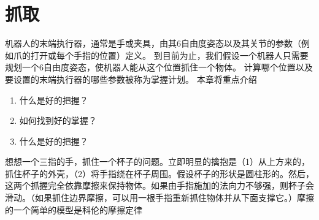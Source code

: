 \chapter{抓取}


机器人的末端执行器，通常是手或夹具，由其6自由度姿态以及其关节的参数（例如爪的打开或每个手指的位置）定义。 到目前为止，我们假设一个机器人只需要规划一个6自由度姿态，使机器人能从这个位置抓住一个物体。 计算哪个位置以及要设置的末端执行器的哪些参数被称为掌握计划。 本章将重点介绍

\begin{enumerate}

\item 什么是好的把握？
\item 如何找到好的掌握？
\item 什么是好的把握？
\end{enumerate}



想想一个三指的手，抓住一个杯子的问题。立即明显的擒抱是（1）从上方来的，抓住杯子的外壳，（2）将手指绕在杯子周围。假设杯子的形状是圆柱形的。然后，这两个抓握完全依靠摩擦来保持物体。如果由手指施加的法向力不够强，则杯子会滑动。（如果抓住边界摩擦，可以用一根手指重新抓住物体并从下面支撑它。）摩擦的一个简单的模型是科伦的摩擦定律

